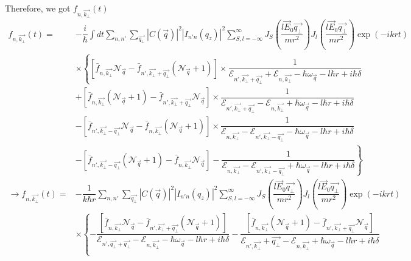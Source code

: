 \documentclass{article}
\begin{document}
Therefore, we got $f_{n,\vec{k_\bot}}(t)$
\begin{align*}
    f_{n,\vec{k_\bot}}(t) = &-\dfrac{i}{\hbar} \int dt \sum_{n,n'}\sum_{\vec{q_\bot}}\left|C\left(\vec{q} \right) \right|^2 \left|I_{n'n}\left(q_z \right) \right|^2 \sum^{\infty}_{S,l=-\infty}J_S \left(\dfrac{l\vec{E}_0\vec{q_\bot}}{mr^2} \right)J_l \left(\dfrac{l\vec{E}_0\vec{q_\bot}}{mr^2} \right) \exp(-ikrt) \\ 
    & \times \left\{\left[\bar{f}_{n,\vec{k_\bot}}\mathcal{N}_{\vec{q}}-\bar{f}_{n',\vec{k_\bot}+\vec{q_\bot}}\left(\mathcal{N}_{\vec{q}}+1 \right) \right]\times\dfrac{1}{\mathcal{E}_{n',\vec{k_\bot}+\vec{q_\bot}}+\mathcal{E}_{n,\vec{k_\bot}}-\hbar\omega_{\vec{q}}-l\hbar r+i\hbar\delta} \right. \\
    & + \left[\bar{f}_{n,\vec{k_\bot}}\left(\mathcal{N}_{\vec{q}}+1 \right)-\bar{f}_{n',\vec{k_\bot}+\vec{q_\bot}}\mathcal{N}_{\vec{q}} \right]\times\dfrac{1}{\mathcal{E}_{n',\vec{k_\bot}+\vec{q_\bot}}-\mathcal{E}_{n,\vec{k_\bot}}+\hbar\omega_{\vec{q}}-l\hbar r+i\hbar\delta}\\
    & - \left[\bar{f}_{n',\vec{k_\bot}-\vec{q_\bot}}\mathcal{N}_{\vec{q}}-\bar{f}_{n,\vec{k_\bot}}\left(\mathcal{N}_{\vec{q}}+1 \right) \right] \times \dfrac{1}{\mathcal{E}_{n,\vec{k_\bot}}-\mathcal{E}_{n',\vec{k_\bot}-\vec{q_\bot}}-\hbar\omega_{\vec{q}}-l\hbar r+i\hbar\delta}\\
    & - \left.\left[\bar{f}_{n',\vec{k_\bot}-\vec{q_\bot}}\left(\mathcal{N}_{\vec{q}}+1\right)-\bar{f}_{n,\vec{k_\bot}}\mathcal{N}_{\vec{q}} \right]-\dfrac{1}{\mathcal{E}_{n,\vec{k_\bot}}-\mathcal{E}_{n',\vec{k_\bot}-\vec{q_\bot}}+\hbar\omega_{\vec{q}}-l\hbar r + i\hbar\delta}\right\}\\
    \to f_{n,\vec{k_\bot}}(t) = & - \dfrac{1}{k \hbar r}\sum_{n,n'}\sum_{\vec{q_\bot}}\left|C\left(\vec{q} \right) \right|^2 \left|I_{n'n}\left(q_z \right) \right|^2 \sum^{\infty}_{S,l=-\infty}J_S \left(\dfrac{l\vec{E}_0\vec{q_\bot}}{mr^2} \right)J_l \left(\dfrac{l\vec{E}_0\vec{q_\bot}}{mr^2} \right) \exp(-ikrt) \\  
    &\times \left\{-\dfrac{\left[\bar{f}_{n,\vec{k_\bot}}\mathcal{N}_{\vec{q}}-\bar{f}_{n',\vec{k_\bot}+\vec{q_\bot}}\left(\mathcal{N}_{\vec{q}}+1 \right) \right]}{\mathcal{E}_{n',\vec{q_\bot}+\vec{q_\bot}}-\mathcal{E}_{n,\vec{k_\bot}}-\hbar\omega_{\vec{q}}-l\hbar r + i\hbar\delta}-\dfrac{\left[\bar{f}_{n,\vec{k_\bot}}\left(\mathcal{N}_{\vec{q}}+1 \right)-\bar{f}_{n',\vec{k_\bot}+\vec{q_\bot}}\mathcal{N}_{\vec{q}} \right]}{\mathcal{E}_{n',\vec{k_\bot}}+\vec{q_\bot}-\mathcal{E}_{n,\vec{k_\bot}}+\hbar\omega_{\vec{q}}-l\hbar r+i\hbar\delta} \right. \\

\end{align*}
\end{document}
